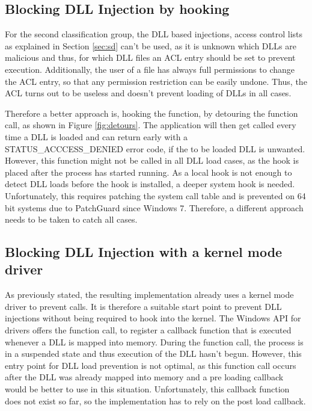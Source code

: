 \subsection{Blocking DLL Injection by hooking }
For the second classification group, the DLL based injections, access control lists as explained in Section \ref{sec:sd} can't be used, as it is unknown which DLLs are malicious and thus, for which DLL files an ACL entry should be set to prevent execution. Additionally, the user of a file has always full permissions to change the ACL entry, so that any permission restriction can be easily undone. Thus, the ACL turns out to be useless and doesn't prevent loading of DLLs in all cases. 

Therefore a better approach is, hooking the  function, by detouring the function call, as shown in Figure \ref{fig:detours}. The application will then get called every time a DLL is loaded and can return early with a STATUS\_ACCCESS\_DENIED error code, if the to be loaded DLL is unwanted. However, this function might not be called in all DLL load cases, as the hook is placed after the process has started running. As a local hook is not enough to detect DLL loads before the hook is installed, a deeper system hook is needed. Unfortunately, this requires patching the system call table and is prevented on 64 bit systems due to PatchGuard since Windows 7. Therefore, a different approach needs to be taken to catch all cases.

\subsection{Blocking DLL Injection with a kernel mode driver}
As previously stated, the resulting implementation already uses a kernel mode driver to prevent  calls. It is therefore a suitable start point to prevent DLL injections without being required to hook into the kernel. The Windows API for drivers offers the  function call, to register a callback function that is executed whenever a DLL is mapped into memory. During the function call, the process is in a suspended state and thus execution of the DLL hasn't begun. However, this entry point for DLL load prevention is not optimal, as this function call occurs after the DLL was already mapped into memory and a pre loading callback would be better to use in this situation. Unfortunately, this callback function does not exist so far, so the implementation has to rely on the post load callback.

